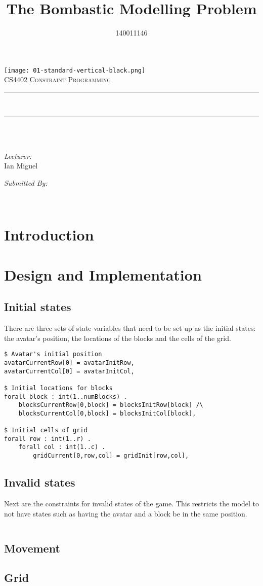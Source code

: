 \documentclass{article}
\title{The Bombastic Modelling Problem}
\author{140011146}
\makeatletter
\newcommand{\maketitlepage}[2]{
\begin{titlepage}
	\centering
    \texttt{[image: 01-standard-vertical-black.png]}\\	%
	\textsc{\LARGE #1}\\[0.5 cm]				%
	\rule{\linewidth}{0.2 mm} \\[0.4 cm]
	{ \huge \bfseries \thetitle}
	\rule{\linewidth}{0.2 mm} \\[0.5 cm]
	\textsc{\large \thedate}\\[1.5 cm]
	
	\begin{minipage}{0.4\textwidth}
		\begin{flushleft} \large
			\emph{Lecturer:}\\
			#2
			\end{flushleft}
			\end{minipage}
			\begin{minipage}{0.4\textwidth}
            
			\begin{flushright} \large
			\emph{Submitted By:} \\
			\theauthor
		\end{flushright}
        
	\end{minipage}\\
	
\end{titlepage}
}
\let\thetitle\@title
\let\theauthor\@author
\let\thedate\@date
\makeatother
\begin{document}
\maketitlepage{CS4402 Constraint Programming}{Ian Miguel}




\section{Introduction}

\section{Design and Implementation}
\subsection{Initial states}
There are three sets of state variables that need to be set up as the initial states: the avatar's position, the locations of the blocks and the cells of the grid. 

\begin{lstlisting}
$ Avatar's initial position
avatarCurrentRow[0] = avatarInitRow,
avatarCurrentCol[0] = avatarInitCol,

$ Initial locations for blocks
forall block : int(1..numBlocks) .
    blocksCurrentRow[0,block] = blocksInitRow[block] /\
    blocksCurrentCol[0,block] = blocksInitCol[block],

$ Initial cells of grid
forall row : int(1..r) .
    forall col : int(1..c) .
        gridCurrent[0,row,col] = gridInit[row,col],
\end{lstlisting}

\subsection{Invalid states}
Next are the constraints for invalid states of the game. This restricts the model to not have states such as having the avatar and a block be in the same position. 

\begin{lstlisting}

\end{lstlisting}

\subsection{Movement}

\subsection{Grid}
\end{document}
